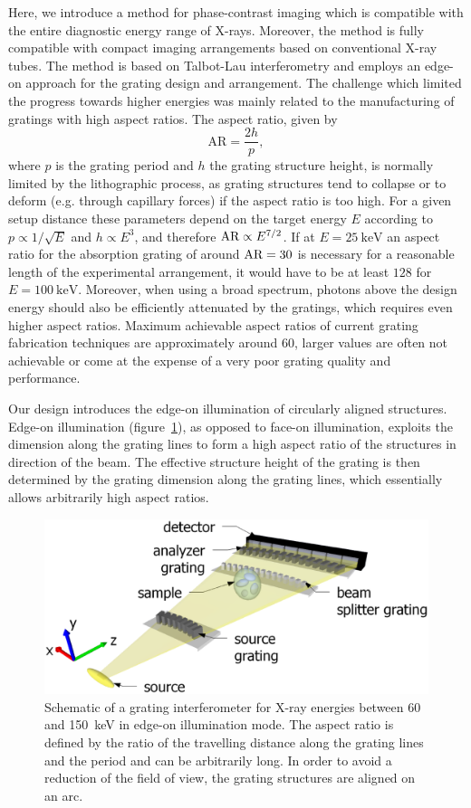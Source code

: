 \documentclass[aps,prl,preprint]{revtex4-1}
\begin{document}
Here, we introduce a method for phase-contrast imaging which is
compatible with the entire diagnostic energy range of X-rays. Moreover, the
method is fully compatible with compact imaging arrangements based on
conventional X-ray tubes. The method is based on Talbot-Lau interferometry
\cite{Pfeiffer2006} and employs an edge-on approach for the grating design and
arrangement. 
The challenge which limited the progress towards higher energies was mainly
related to the manufacturing of gratings with high aspect ratios. The aspect
ratio, given by
\begin{equation}
    \text{AR} = \frac{2h}{p},
\end{equation}
where $p$ is the grating period and $h$ the grating structure
height, is normally limited by the lithographic process, as grating
structures tend to collapse or to deform (e.g. through capillary forces) if
the aspect ratio is too high. For a given setup distance these parameters
depend on the target energy $E$ according to $p \propto
1/\sqrt{E}$ and $h \propto E^3$, and therefore $\textnormal{AR}
\propto E^{7/2}$\cite{Momose2003a}. If at $E=\SI{25}{\kilo\electronvolt}$ an aspect ratio
for the absorption grating of around $\textnormal{AR}=30$ is necessary for a
reasonable length of the experimental arrangement, it would have to be at
least $128$ for $E=\SI{100}{\kilo\electronvolt}$. Moreover, when using a
broad spectrum, photons above the design energy should also be
efficiently attenuated by the gratings, which requires even higher aspect ratios.
Maximum achievable aspect ratios of current grating fabrication techniques
\cite{David2007,Kenntner2010} are approximately around 60,
larger values are often not achievable or come at the expense of a very poor
grating quality and performance.

Our design introduces the edge-on
illumination of circularly aligned structures. Edge-on illumination
(figure~\ref{Fig:schematic}), as
opposed to face-on illumination, exploits the dimension along the grating
lines to form a high aspect ratio of the structures in direction of the beam. The
effective structure height of the grating is then determined by the grating
dimension along the grating lines, which essentially allows arbitrarily high
aspect ratios. 
\begin{figure}[ht]
    \includegraphics[width=.5\textwidth]{figures/figure1.eps}
    \caption{Schematic of a grating
        interferometer for X-ray energies between 60 and
        \SI{150}{\kilo\electronvolt} in edge-on illumination mode. The
        aspect ratio is defined by the ratio of the travelling distance along the
        grating lines and the period and can be arbitrarily long. In order to avoid
        a reduction of the field of view, the grating structures are aligned on an
    arc.}
    \label{Fig:schematic}
\end{figure}
\end{document}
